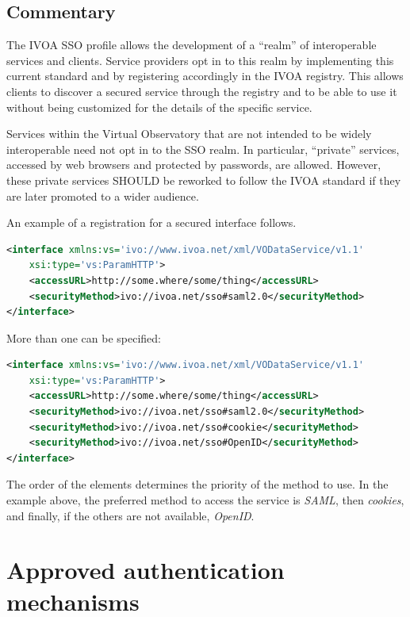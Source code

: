 \documentclass[11pt,a4paper]{ivoa}
\begin{document}
\subsection{Commentary}
The IVOA SSO profile allows the development of a ``realm'' of interoperable services and clients. 
Service providers opt in to this realm by implementing this current standard and by registering accordingly in the IVOA registry. 
This allows clients to discover a secured service through the registry and to be able to use it without 
being customized for the details of the specific service.

Services within the Virtual Observatory that are not intended to be widely interoperable need not opt in to the SSO realm. 
In particular, ``private'' services, accessed by web browsers and protected by passwords, are allowed. 
However, these private services SHOULD be reworked to follow the IVOA standard if they are later promoted to a wider audience.

An example of a registration for a secured interface follows.
\begin{lstlisting}[language=XML]
<interface xmlns:vs='ivo://www.ivoa.net/xml/VODataService/v1.1'  
	xsi:type='vs:ParamHTTP'>
	<accessURL>http://some.where/some/thing</accessURL>
	<securityMethod>ivo://ivoa.net/sso#saml2.0</securityMethod>
</interface> 
\end{lstlisting}

More than one  can be specified:
\begin{lstlisting}[language=XML]
<interface xmlns:vs='ivo://www.ivoa.net/xml/VODataService/v1.1'  
	xsi:type='vs:ParamHTTP'>
	<accessURL>http://some.where/some/thing</accessURL>
	<securityMethod>ivo://ivoa.net/sso#saml2.0</securityMethod>
	<securityMethod>ivo://ivoa.net/sso#cookie</securityMethod>
	<securityMethod>ivo://ivoa.net/sso#OpenID</securityMethod>
</interface> 
\end{lstlisting}


The order of the  elements determines the priority of
the method to use.  In the example above, the preferred method to access
the service is  {\em SAML}, then {\em cookies}, and finally, if the others are not available,
{\em OpenID}.

\section{Approved authentication mechanisms}
\end{document}
